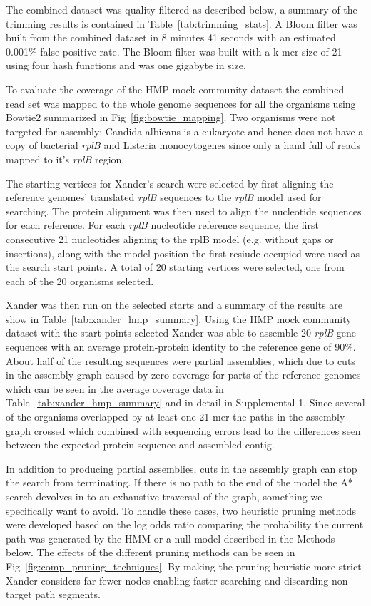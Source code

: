 \documentclass[10pt]{bmc_article}
\newenvironment{bmcformat}{\begin{raggedright}\baselineskip20pt\sloppy\setboolean{publ}{false}}{\end{raggedright}\baselineskip20pt\sloppy}
\begin{document}
\begin{bmcformat}
The combined dataset was quality filtered as described below, a summary of the trimming results is contained in Table~\ref{tab:trimming_stats}.  A Bloom filter was built from the combined dataset in 8 minutes 41 seconds with an estimated 0.001\% false positive rate.  The Bloom filter was built with a k-mer size of 21 using four hash functions and was one gigabyte in size.

To evaluate the coverage of the HMP mock community dataset the combined read set was mapped to the whole genome sequences for all the organisms using Bowtie2\cite{langmead_fast_2012} summarized in Fig~\ref{fig:bowtie_mapping}.  Two organisms were not targeted for assembly: Candida albicans is a eukaryote and hence does not have a copy of bacterial \emph{rplB} and Listeria monocytogenes since only a hand full of reads mapped to it's \emph{rplB} region.

The starting vertices for Xander's search were selected by first aligning the reference genomes' translated \emph{rplB} sequences to the \emph{rplB} model used for searching.  The protein alignment was then used to align the nucleotide sequences for each reference.  For each \emph{rplB} nucleotide reference sequence, the first consecutive 21 nucleotides aligning to the rplB model (e.g. without gaps or insertions), along with the model position the first resiude occupied were used as the search start points.  A total of 20 starting vertices were selected, one from each of the 20 organisms selected.

Xander was then run on the selected starts and a summary of the results are show in Table~\ref{tab:xander_hmp_summary}.  Using the HMP mock community dataset with the start points selected Xander was able to assemble 20 \emph{rplB} gene sequences with an average protein-protein identity to the reference gene of 90\%.  About half of the resulting sequences were partial assemblies, which due to cuts in the assembly graph caused by zero coverage for parts of the reference genomes which can be seen in the average coverage data in Table~\ref{tab:xander_hmp_summary} and in detail in Supplemental 1.  Since several of the organisms overlapped by at least one 21-mer the paths in the assembly graph crossed which combined with sequencing errors lead to the differences seen between the expected protein sequence and assembled contig.

In addition to producing partial assemblies, cuts in the assembly graph can stop the search from terminating. If there is no path to the end of the model the A* search devolves in to an exhaustive traversal of the graph, something we specifically want to avoid.  To handle these cases, two heuristic pruning methods were developed based on the log odds ratio comparing the probability the current path was generated by the HMM or a null model described in the Methods below.  The effects of the different pruning methods can be seen in Fig~\ref{fig:comp_pruning_techniques}.  By making the pruning heuristic more strict Xander considers far fewer nodes enabling faster searching and discarding non-target path segments.


\end{bmcformat}
\end{document}
